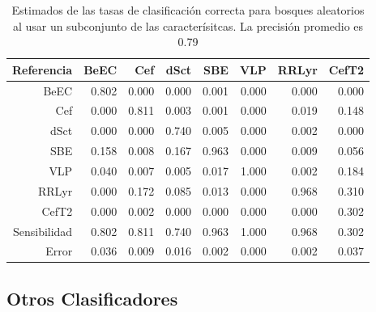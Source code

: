 \documentclass[letterpaper,12pt]{book}
\begin{document}
\begin{table}[ht]
  \centering
  \begin{tabular}{rrrrrrrr}
    \hline
    Referencia & BeEC & Cef & dSct & SBE & VLP & RRLyr & CefT2 \\ 
    \hline
    BeEC & 0.802 & 0.000 & 0.000 & 0.001 & 0.000 & 0.000 & 0.000 \\ 
    Cef & 0.000 & 0.811 & 0.003 & 0.001 & 0.000 & 0.019 & 0.148 \\ 
    dSct & 0.000 & 0.000 & 0.740 & 0.005 & 0.000 & 0.002 & 0.000 \\ 
    SBE & 0.158 & 0.008 & 0.167 & 0.963 & 0.000 & 0.009 & 0.056 \\ 
    VLP & 0.040 & 0.007 & 0.005 & 0.017 & 1.000 & 0.002 & 0.184 \\ 
    RRLyr & 0.000 & 0.172 & 0.085 & 0.013 & 0.000 & 0.968 & 0.310 \\ 
    CefT2 & 0.000 & 0.002 & 0.000 & 0.000 & 0.000 & 0.000 & 0.302 \\ 
    \hline
    \hline
    Sensibilidad &0.802 &0.811 & 0.740 & 0.963 & 1.000 &0.968 & 0.302 \\
    \hline 
    Error & 0.036 & 0.009 & 0.016 & 0.002 & 0.000 & 0.002 & 0.037 \\ 
    \hline
    \hline
  \end{tabular}
  \caption{Estimados de las tasas de clasificación correcta para bosques aleatorios al usar un subconjunto de las caracterísitcas. La precisión promedio es 0.79}
\end{table}


\subsection{Otros Clasificadores}
\end{document}
